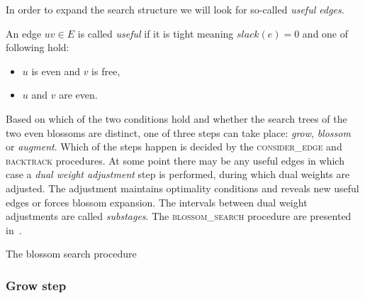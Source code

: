 In order to expand the search structure we will look for so-called \emph{useful edges}.

\begin{defn}
    An edge $uv \in E$ is called \emph{useful} if it is tight meaning $slack(e) = 0$ and one of following hold:

    \begin{itemize}
        \item $u$ is even and $v$ is free,
        \item $u$ and $v$ are even.
    \end{itemize}
\end{defn}

Based on which of the two conditions hold and whether the search trees of the two even blossoms are distinct, one of three steps can take place: \emph{grow}, \emph{blossom} or \emph{augment}. Which of the steps happen is decided by the \textsc{consider\_edge} and \textsc{backtrack} procedures. At some point there may be any useful edges in which case a \emph{dual weight adjustment} step is performed, during which dual weights are adjusted. The adjustment maintains optimality conditions and reveals new useful edges or forces blossom expansion. The intervals between dual weight adjustments are called \emph{substages}. The \textsc{blossom\_search} procedure are presented in~.

\begin{algorithm}
\caption{The blossom search procedure}\label{alg:blossom_search}
\begin{algorithmic}[1]
    \Else
    \EndIf
\EndFor
\State
{}
    \EndWhile
\EndWhile
\EndProcedure
\State
{}
\Else{}
\EndIf
\EndProcedure
\end{algorithmic}
\end{algorithm}

\subsubsection*{Grow step}

